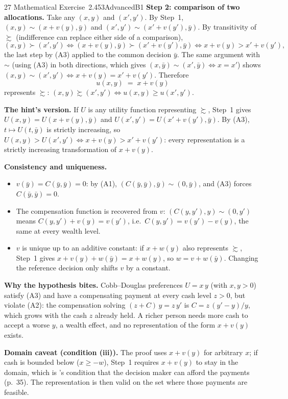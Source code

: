 \begin{exsol}{27}{\MR{} Mathematical Exercise~2.4}{53}{Advanced}{B1}
\textbf{Step 2: comparison of two allocations.} Take any $(x, y)$ and $(x', y')$. By Step~1,
$(x, y) \sim (x + v(y), \bar y)$ and $(x', y') \sim (x' + v(y'), \bar y)$. By transitivity of
$\succsim$ (indifference can replace either side of a comparison),
\[
  (x, y) \succ (x', y') \iff (x + v(y), \bar y) \succ (x' + v(y'), \bar y)
  \iff x + v(y) > x' + v(y'),
\]
the last step by (A3) applied to the common decision $\bar y$. The same argument with $\sim$
(using (A3) in both directions, which gives $(x,\bar y) \sim (x', \bar y) \iff x = x'$) shows
$(x, y) \sim (x', y') \iff x + v(y) = x' + v(y')$. Therefore
\[
  u(x, y) \;=\; x + v(y)
\]
represents $\succsim$: $(x, y) \succsim (x', y') \iff u(x, y) \ge u(x', y')$.

\textbf{The hint's version.} If $U$ is any utility function representing $\succsim$, Step~1 gives
$U(x, y) = U(x + v(y), \bar y)$ and $U(x', y') = U(x' + v(y'), \bar y)$. By (A3),
$t \mapsto U(t, \bar y)$ is strictly increasing, so
$U(x, y) > U(x', y') \iff x + v(y) > x' + v(y')$: every representation is a strictly increasing
transformation of $x + v(y)$.

\textbf{Consistency and uniqueness.}
\begin{itemize}
  \item $v(\bar y) = C(\bar y, \bar y) = 0$: by (A1), $(C(\bar y, \bar y), \bar y) \sim (0, \bar y)$,
  and (A3) forces $C(\bar y, \bar y) = 0$.
  \item The compensation function is recovered from $v$: $(C(y, y'), y) \sim (0, y')$ means
  $C(y, y') + v(y) = v(y')$, i.e.\ $C(y, y') = v(y') - v(y)$, the same at every wealth level.
  \item $v$ is unique up to an additive constant: if $x + w(y)$ also represents $\succsim$, Step~1
  gives $x + v(y) + w(\bar y) = x + w(y)$, so $w = v + w(\bar y)$. Changing the reference decision
  only shifts $v$ by a constant.
\end{itemize}

\textbf{Why the hypothesis bites.} Cobb--Douglas preferences $U = x\,y$ (with $x, y > 0$) satisfy
(A3) and have a compensating payment at every cash level $z > 0$, but violate (A2): the
compensation solving $(z + C)\,y = z\,y'$ is
$C = z\,(y' - y)/y$, which grows with the cash $z$ already held. A richer person needs more cash to
accept a worse $y$, a wealth effect, and no representation of the form $x + v(y)$ exists.

\textbf{Domain caveat (condition (iii)).} The proof uses $x + v(y)$ for arbitrary $x$; if cash is
bounded below ($x \ge -w$), Step~1 requires $x + v(y)$ to stay in the domain, which is \MR's
condition that the decision maker can afford the payments (p.~35). The representation is then
valid on the set where those payments are feasible.


\end{exsol}
